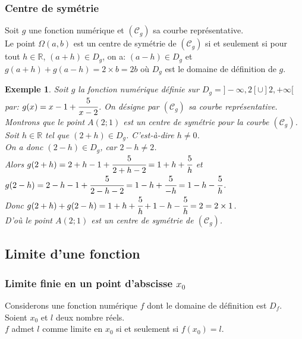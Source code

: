 \documentclass[a4paper, 12pt]{report}
\newtheorem{exemple}{Exemple}[section]
\begin{document}
                \subsubsection{Centre de symétrie} \label{impaire}
                Soit $g$ une fonction numérique et $(\mathcal{C}_g)$ sa courbe représentative.\\ 
                Le point $\Omega (a,b)$ est un centre de symétrie de $(\mathcal{C}_g)$ si et seulement si pour tout $h\in \mathbb{R}$, 
                $(a+h)\in D_g$, on a: $(a-h)\in D_g$ et $g(a+h)+g(a-h)=2\times b=2b$ où $D_g$ est le domaine de 
                définition de $g$.
                    \begin{exemple}
                        Soit $g$ la fonction numérique définie sur $D_g=]-\infty,2[\cup]2,+\infty[$ par: $g(x)=x-1+\cfrac{5}{x-2}$.
                        On désigne par $(\mathcal{C}_g)$ sa courbe représentative. \\ 
                        Montrons que le point $A(2;1)$ est un centre de symétrie pour la courbe $(\mathcal{C}_g)$.\\ 
                        Soit $h\in \mathbb{R}$ tel que $(2+h)\in D_g$. C'est-à-dire $h\neq 0$. \\ 
                        On a donc $(2-h)\in D_g$, car $2-h \neq 2$.\\ 
                        Alors $g(2+h)=2+h-1+\cfrac{5}{2+h-2}=1+h+\cfrac{5}{h}$ et \\ 
                        $g(2-h)=2-h-1+\cfrac{5}{2-h-2}=1-h+\cfrac{5}{-h}=1-h-\cfrac{5}{h}$.\\
                        Donc $g(2+h)+g(2-h)=1+h+\cfrac{5}{h}+1-h-\cfrac{5}{h}=2=2\times 1$.\\
                        D'où le point $A(2;1)$ est un centre de symétrie de $(\mathcal{C}_g)$.
                    \end{exemple}

            \subsection{Limite d'une fonction}
                \subsubsection{Limite finie en un point d'abscisse $x_0$}
                Considerons une fonction numérique $f$ dont le domaine de définition est $D_f$.\\ 
                Soient $x_0$ et $l$ deux nombre réels.\\ 
                $f$ admet $l$ comme limite en $x_0$ si et seulement si $f(x_0)=l$.
\end{document}
